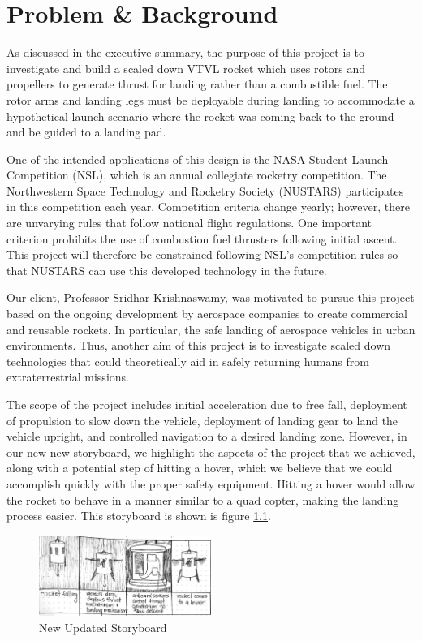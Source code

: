 
\chapter{Problem \& Background}

As discussed in the executive summary, the purpose of this project is to investigate and build a scaled down VTVL rocket which uses rotors and propellers to generate thrust for landing rather than a combustible fuel. The rotor arms and landing legs must be deployable during landing to accommodate a hypothetical launch scenario where the rocket was coming back to the ground and be guided to a landing pad.

One of the intended applications of this design is the NASA Student Launch Competition (NSL), which is an annual collegiate rocketry competition. The Northwestern Space Technology and Rocketry Society (NUSTARS) participates in this competition each year. Competition criteria change yearly; however, there are unvarying rules that follow national flight regulations. One important criterion prohibits the use of combustion fuel thrusters following initial ascent. This project will therefore be constrained following NSL’s competition rules so that NUSTARS can use this developed technology in the future. 

Our client, Professor Sridhar Krishnaswamy, was motivated to pursue this project based on the ongoing development by aerospace companies to create commercial and reusable rockets. In particular, the safe landing of aerospace vehicles in urban environments. Thus, another aim of this project is to investigate scaled down technologies that could theoretically aid in safely returning humans from extraterrestrial missions.

The scope of the project includes initial acceleration due to free fall, deployment of propulsion to slow down the vehicle, deployment of landing gear to land the vehicle upright, and controlled navigation to a desired landing zone. However, in our new new storyboard, we highlight the aspects of the project that we achieved, along with a potential step of hitting a hover, which we believe that we could accomplish quickly with the proper safety equipment. Hitting a hover would allow the rocket to behave in a manner similar to a quad copter, making the landing process easier. This storyboard is shown is figure \ref{fig:storyboard}.

\begin{figure}
    \centering
    \includegraphics[width = 0.5\textwidth]{src/figs/Storyboard.png}
    \caption{New Updated Storyboard}
    \label{fig:storyboard}
\end{figure}

